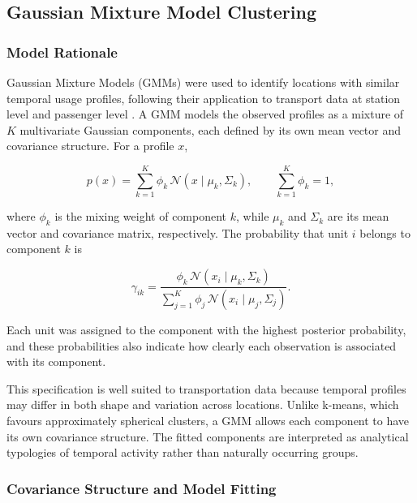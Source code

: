 \subsection{Gaussian Mixture Model Clustering}

\subsubsection{Model Rationale}

Gaussian Mixture Models (GMMs) were used to identify locations with similar temporal usage profiles, following their application to transport data at station level \citep{Kim2017,Verma2021,Wang2026} and passenger level \citep{Briand2016,ElMahrsi2017}. A GMM models the observed profiles as a mixture of $K$ multivariate Gaussian components, each defined by its own mean vector and covariance structure. For a profile $x$,

\begin{equation}
p(x) = \sum_{k=1}^{K} \phi_k\, \mathcal{N}(x \mid \mu_k, \Sigma_k), \qquad \sum_{k=1}^{K} \phi_k = 1,
\end{equation}

where $\phi_k$ is the mixing weight of component $k$, while $\mu_k$ and $\Sigma_k$ are its mean vector and covariance matrix, respectively. The probability that unit $i$ belongs to component $k$ is

\begin{equation}
\gamma_{ik} = \frac{\phi_k\, \mathcal{N}(x_i \mid \mu_k, \Sigma_k)}{\sum_{j=1}^{K} \phi_j\, \mathcal{N}(x_i \mid \mu_j, \Sigma_j)}.
\end{equation}

Each unit was assigned to the component with the highest posterior probability, and these probabilities also indicate how clearly each observation is associated with its component.

This specification is well suited to transportation data because temporal profiles may differ in both shape and variation across locations. Unlike k-means, which favours approximately spherical clusters, a GMM allows each component to have its own covariance structure. The fitted components are interpreted as analytical typologies of temporal activity rather than naturally occurring groups.

\subsubsection{Covariance Structure and Model Fitting}

